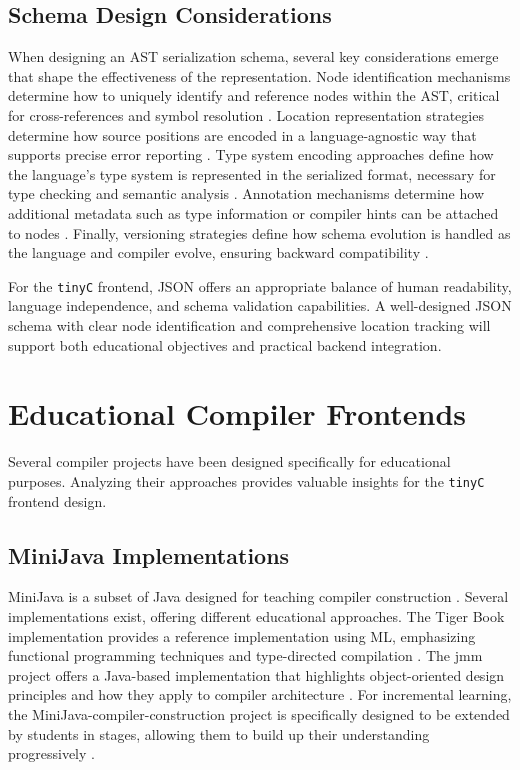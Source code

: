 \subsection{Schema Design Considerations}

When designing an AST serialization schema, several key considerations emerge that shape the effectiveness of the representation. Node identification mechanisms determine how to uniquely identify and reference nodes within the AST, critical for cross-references and symbol resolution \cite{parr2010language}. Location representation strategies determine how source positions are encoded in a language-agnostic way that supports precise error reporting \cite{parr2013definitive}. Type system encoding approaches define how the language's type system is represented in the serialized format, necessary for type checking and semantic analysis \cite{appel2004modern}. Annotation mechanisms determine how additional metadata such as type information or compiler hints can be attached to nodes \cite{appel2004modern}. Finally, versioning strategies define how schema evolution is handled as the language and compiler evolve, ensuring backward compatibility \cite{varda2008protocol}.

For the \texttt{tinyC} frontend, JSON offers an appropriate balance of human readability, language independence, and schema validation capabilities. A well-designed JSON schema with clear node identification and comprehensive location tracking will support both educational objectives and practical backend integration.




\section{Educational Compiler Frontends}

Several compiler projects have been designed specifically for educational purposes. Analyzing their approaches provides valuable insights for the \texttt{tinyC} frontend design.

\subsection{MiniJava Implementations}

MiniJava is a subset of Java designed for teaching compiler construction \cite{appel1998modern}. Several implementations exist, offering different educational approaches. The Tiger Book implementation provides a reference implementation using ML, emphasizing functional programming techniques and type-directed compilation \cite{appel1998modern}. The jmm project offers a Java-based implementation that highlights object-oriented design principles and how they apply to compiler architecture \cite{patel2021comparing}. For incremental learning, the MiniJava-compiler-construction project is specifically designed to be extended by students in stages, allowing them to build up their understanding progressively \cite{patel2021comparing}.


